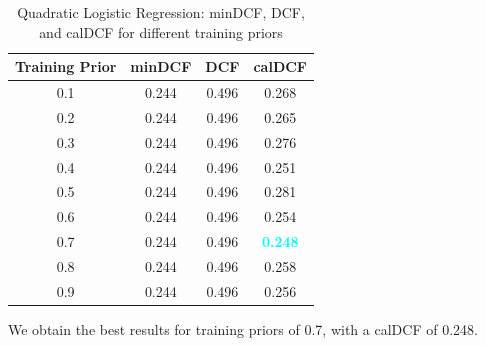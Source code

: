 \documentclass[12pt]{report}
\begin{document}
\begin{table}[H]
    \centering
    \begin{tabular}{|c|c|c|c|}
        \hline
        \rowcolor{blue!10}
        \textbf{Training Prior} & \textbf{minDCF} & \textbf{DCF} & \textbf{calDCF}                  \\
        \hline
        0.1                     & 0.244           & 0.496        & 0.268                            \\
        \hline
        0.2                     & 0.244           & 0.496        & 0.265                            \\
        \hline
        0.3                     & 0.244           & 0.496        & 0.276                            \\
        \hline
        0.4                     & 0.244           & 0.496        & 0.251                            \\
        \hline
        0.5                     & 0.244           & 0.496        & 0.281                            \\
        \hline
        0.6                     & 0.244           & 0.496        & 0.254                            \\
        \hline
        0.7                     & 0.244           & 0.496        & \textcolor{cyan}{\textbf{0.248}} \\
        \hline
        0.8                     & 0.244           & 0.496        & 0.258                            \\
        \hline
        0.9                     & 0.244           & 0.496        & 0.256                            \\
        \hline
    \end{tabular}
    \caption{Quadratic Logistic Regression: minDCF, DCF, and calDCF for different training priors}
    \label{tab:QLR_Priors}
\end{table}
\noindent
We obtain the best results for training priors of 0.7, with a calDCF of 0.248.
\end{document}
